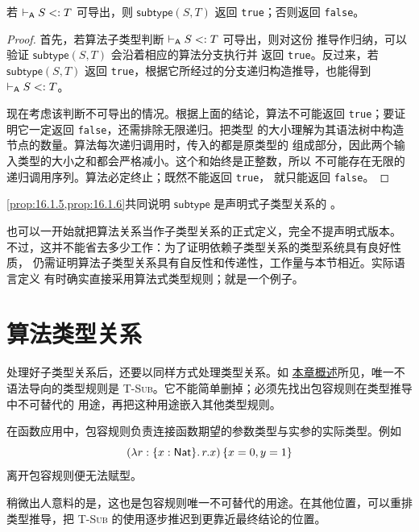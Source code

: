 \begin{proposition}[终止性]
\label{prop:16.1.6}
若 \(\mathrel{\vdash_{\mathsf A}} S\mathrel{<:} T\) 可导出，则
\(\mathsf{subtype}(S,T)\) 返回 \texttt{true}；否则返回 \texttt{false}。
\end{proposition}
\begin{proof}
首先，若算法子类型判断 \(\mathrel{\vdash_{\mathsf A}} S\mathrel{<:} T\) 可导出，则对这份
推导作归纳，可以验证 \(\mathsf{subtype}(S,T)\) 会沿着相应的算法分支执行并
返回 \texttt{true}。反过来，若 \(\mathsf{subtype}(S,T)\) 返回
\texttt{true}，根据它所经过的分支递归构造推导，也能得到
\(\mathrel{\vdash_{\mathsf A}} S\mathrel{<:} T\)。

现在考虑该判断不可导出的情况。根据上面的结论，算法不可能返回
\texttt{true}；要证明它一定返回 \texttt{false}，还需排除无限递归。把类型
的大小理解为其语法树中构造节点的数量。算法每次递归调用时，传入的都是原类型的
组成部分，因此两个输入类型的大小之和都会严格减小。这个和始终是正整数，所以
不可能存在无限的递归调用序列。算法必定终止；既然不能返回 \texttt{true}，
就只能返回 \texttt{false}。
\end{proof}

\cref{prop:16.1.5,prop:16.1.6}共同说明
\(\mathsf{subtype}\) 是声明式子类型关系的
。

也可以一开始就把算法关系当作子类型关系的正式定义，完全不提声明式版本。
不过，这并不能省去多少工作：为了证明依赖子类型关系的类型系统具有良好性质，
仍需证明算法子类型关系具有自反性和传递性，工作量与本节相近。实际语言定义
有时确实直接采用算法式类型规则；就是一个例子。

\section{算法类型关系}
\label{sec:16.2}

处理好子类型关系后，还要以同样方式处理类型关系。如
\hyperref[sec:16-overview]{本章概述}所见，唯一不语法导向的类型规则是
\textsc{T-Sub}。它不能简单删掉；必须先找出包容规则在类型推导中不可替代的
用途，再把这种用途嵌入其他类型规则。

在函数应用中，包容规则负责连接函数期望的参数类型与实参的实际类型。例如
\[
  (\lambda r:\{x:\mathsf{Nat}\}.\,r.x)\,
  \{x=0,y=1\}
\]
离开包容规则便无法赋型。

稍微出人意料的是，这也是包容规则唯一不可替代的用途。在其他位置，可以重排
类型推导，把 \textsc{T-Sub} 的使用逐步推迟到更靠近最终结论的位置。


